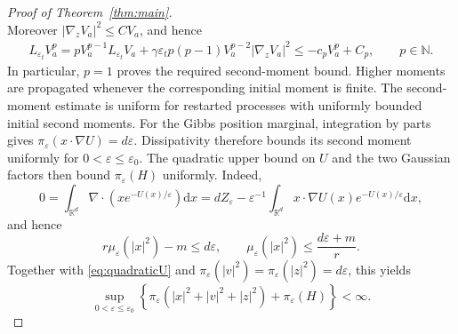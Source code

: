 \documentclass[11pt]{article}
\theoremstyle{definition}
\newcommand{\R}{\mathbb R}
\newcommand{\dd}{\mathrm d}
\newcommand{\eps}{\varepsilon}
\begin{document}
\begin{proof}[Proof of Theorem~\ref{thm:main}]
\begin{equation}
\end{equation}
Moreover $|\nabla_z V_a|^2\leq C V_a$, and hence
\begin{align*}
 L_{\eps_t}V_a^p
 =pV_a^{p-1}L_{\eps_t}V_a
   +\gamma\eps_t p(p-1)V_a^{p-2}|\nabla_zV_a|^2\leq-c_pV_a^p+C_p,
 \qquad p\in\mathbb N.
\end{align*}
In particular, $p=1$ proves the required second-moment bound. Higher moments
are propagated whenever the corresponding initial moment is finite. The
second-moment estimate is uniform for restarted processes with uniformly
bounded initial second moments.
For the Gibbs position marginal, integration by parts gives
$\pi_\eps(x\cdot\nabla U)=d\eps$. Dissipativity therefore bounds its
second moment uniformly for $0<\eps\leq\eps_0$. The quadratic upper bound
on $U$ and the two Gaussian factors then bound $\pi_\eps(H)$ uniformly.
Indeed,
\[
 0=\int_{\R^d}\nabla\cdot\left(xe^{-U(x)/\eps}\right)\dd x
 =dZ_\eps-\eps^{-1}\int_{\R^d}
 x\cdot\nabla U(x)e^{-U(x)/\eps}\dd x,
\]
and hence
\[
 r\mu_\eps(|x|^2)-m\leq d\eps,
 \qquad
 \mu_\eps(|x|^2)\leq\frac{d\eps+m}{r}.
\]
Together with \eqref{eq:quadraticU} and
$\pi_\eps(|v|^2)=\pi_\eps(|z|^2)=d\eps$, this yields
\begin{equation}\label{eq:gibbsmoments}
 \sup_{0<\eps\leq\eps_0}
 \left\{\pi_\eps\left(|x|^2+|v|^2+|z|^2\right)+\pi_\eps(H)\right\}<\infty.
\end{equation}


\end{proof}
\end{document}
